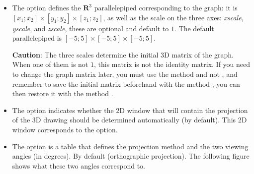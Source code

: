 \begin{itemize}
    \item The option  defines the $\mathbf R^3$ parallelepiped corresponding to the graph: it is $[x_1;x_2]\times[y_1;y_2]\times[z_1;z_2]$, as well as the scale on the three axes: \emph{xscale}, \emph{yscale}, and \emph{zscale}, these are optional and default to $1$. The default parallelepiped is $[-5;5]\times[-5;5]\times[-5;5]$.

    \textbf{Caution}: The three scales determine the initial 3D matrix of the graph. When one of them is not $1$, this matrix is ​​not the identity matrix. If you need to change the graph matrix later, you must use the method  and not , and remember to save the initial matrix beforehand with the method , you can then restore it with the method .

    \item The option  indicates whether the 2D window that will contain the projection of the 3D drawing should be determined automatically (\false by default). This 2D window corresponds to the  option.

    \item The option  is a table that defines the projection method and the two viewing angles (in degrees). By default   (orthographic projection). The following figure shows what these two angles correspond to.


\end{itemize}
